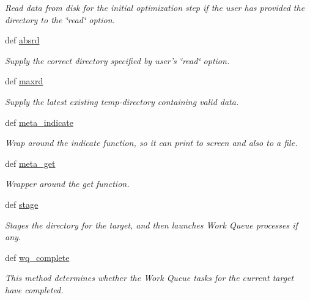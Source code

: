 \begin{DoxyCompactItemize}
\begin{DoxyCompactList}\small\item\em Read data from disk for the initial optimization step if the user has provided the directory to the \char`\"{}read\char`\"{} option. \end{DoxyCompactList}\item 
def \hyperlink{classforcebalance_1_1target_1_1Target_abb0a6089d8deaead8f78186cc8e4cbe4}{absrd}
\begin{DoxyCompactList}\small\item\em Supply the correct directory specified by user's \char`\"{}read\char`\"{} option. \end{DoxyCompactList}\item 
def \hyperlink{classforcebalance_1_1target_1_1Target_a961ce7e772836b1465cb44e3f03145df}{maxrd}
\begin{DoxyCompactList}\small\item\em Supply the latest existing temp-\/directory containing valid data. \end{DoxyCompactList}\item 
def \hyperlink{classforcebalance_1_1target_1_1Target_a99c84ef8ea504d7699c927e261f648e4}{meta\-\_\-indicate}
\begin{DoxyCompactList}\small\item\em Wrap around the indicate function, so it can print to screen and also to a file. \end{DoxyCompactList}\item 
def \hyperlink{classforcebalance_1_1target_1_1Target_a17c8ac0c7dd0a0430accddfd12602103}{meta\-\_\-get}
\begin{DoxyCompactList}\small\item\em Wrapper around the get function. \end{DoxyCompactList}\item 
def \hyperlink{classforcebalance_1_1target_1_1Target_af8d2a4658c87841e40296795aec478bb}{stage}
\begin{DoxyCompactList}\small\item\em Stages the directory for the target, and then launches Work Queue processes if any. \end{DoxyCompactList}\item 
def \hyperlink{classforcebalance_1_1target_1_1Target_af6099ec09486213869dba2491bd8ea04}{wq\-\_\-complete}
\begin{DoxyCompactList}\small\item\em This method determines whether the Work Queue tasks for the current target have completed. \end{DoxyCompactList}\item 

\end{DoxyCompactItemize}
